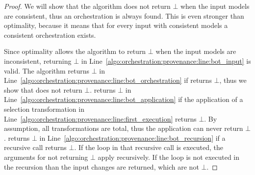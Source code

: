 \begin{proof}
    We will show that the algorithm does not return $\bot$ when the input models are consistent, thus an orchestration is always found.
    This is even stronger than optimality, because it means that for every input with consistent models a consistent orchestration exists.

    Since optimality allows the algorithm to return $\bot$ when the input models are inconsistent, returning $\bot$ in Line~\ref{algo:orchestration:provenance:line:bot_input} is valid.
    The algorithm returns $\bot$ in Line~\ref{algo:orchestration:provenance:line:bot_orchestration} if  returns $\bot$, thus we show that  does not return $\bot$.
     returns $\bot$ in Line~\ref{algo:orchestration:provenance:line:bot_application} if the application of a selection transformation in Line~\ref{algo:orchestration:provenance:line:first_execution} returns $\bot$. By assumption, all transformations are total, thus the application can never return $\bot$.
     returns $\bot$ in Line~\ref{algo:orchestration:provenance:line:bot_recursion} if a recursive call returns $\bot$. If the loop in that recursive call is executed, the arguments for not returning $\bot$ apply recursively. If the loop is not executed in the recursion than the input changes are returned, which are not $\bot$.
    

\end{proof}

